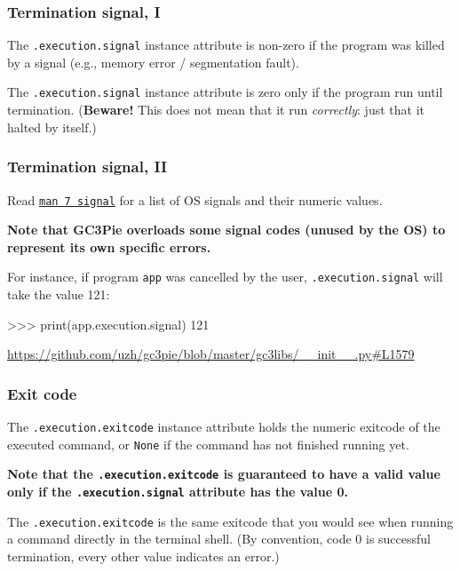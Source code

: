 \documentclass[english,serif,mathserif,xcolor=pdftex,dvipsnames,table]{beamer}
\begin{document}
\begin{frame}[fragile]
  \frametitle{Termination signal, I}

  The \texttt{.execution.signal} instance attribute is non-zero if
  the program was killed by a signal (e.g., memory error / segmentation fault).

  \+
  The \texttt{.execution.signal} instance attribute is zero only if
  the program run until termination. (\textbf{Beware!} This does not
  mean that it run \emph{correctly}: just that it halted by itself.)
\end{frame}


\begin{frame}[fragile]
  \frametitle{Termination signal, II}

  Read
  \href{http://man7.org/linux/man-pages/man7/signal.7.html}{\texttt{man
      7 signal}} for a list of OS signals and their numeric values.

  \+
  {\bfseries Note that GC3Pie overloads some signal codes (unused
    by the OS) to represent its own specific errors.}

  \+
  For instance, if program \texttt{app} was cancelled by the user,
  \texttt{.execution.signal} will take the value 121:
\begin{python}
>>> print(app.execution.signal)
121
\end{python}

\begin{references}
  \tiny\url{https://github.com/uzh/gc3pie/blob/master/gc3libs/__init__.py#L1579}
\end{references}
\end{frame}


\begin{frame}[fragile]
  \frametitle{Exit code}

  The \texttt{.execution.exitcode} instance attribute holds the
  numeric exitcode of the executed command, or \texttt{None} if the
  command has not finished running yet.

  \+
  {\bfseries Note that the \texttt{.execution.exitcode} is guaranteed
    to have a valid value only if the \texttt{.execution.signal}
    attribute has the value 0.}

  \+
  The \texttt{.execution.exitcode} is the same exitcode that you
  would see when running a command directly in the terminal shell. (By
  convention, code 0 is successful termination, every other value
  indicates an error.)
\end{frame}
\end{document}
